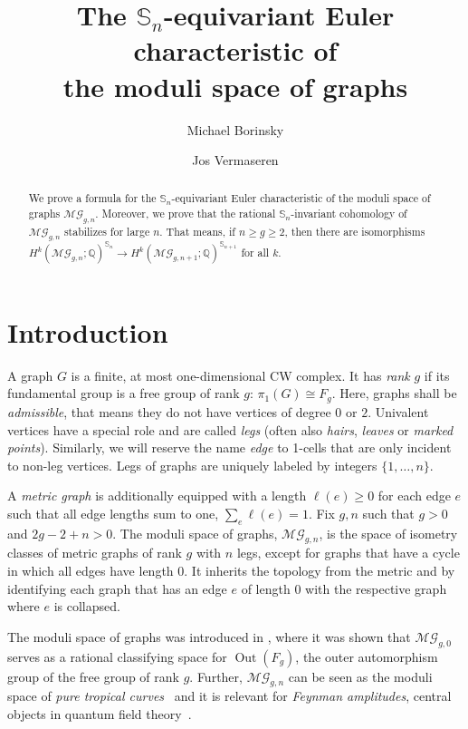 \documentclass[oneside]{amsart}
\title[The ${\mathbb S}_n$-equivariant Euler characteristic of the moduli space of graphs]{The ${\mathbb S}_n$-equivariant Euler characteristic of\\ the moduli space of graphs}
\author{Michael Borinsky \and Jos Vermaseren}
\theoremstyle{remark}
\newcommand{\Out}{{\operatorname{Out}}}
\newcommand{\MG}{\mathcal{MG}}
\begin{document}
\begin{abstract}
We prove a formula for the ${\mathbb S}_n$-equivariant Euler characteristic of the moduli space of graphs $\mathcal{MG}_{g,n}$. Moreover, we prove that the rational ${\mathbb S}_n$-invariant cohomology of $\mathcal{MG}_{g,n}$ stabilizes for large $n$. That means, if $n \geq g \geq 2$, then there are isomorphisms $H^k(\mathcal{MG}_{g,n};\mathbb{Q})^{{\mathbb S}_n} \rightarrow H^k(\mathcal{MG}_{g,n+1};\mathbb{Q})^{{\mathbb S}_{n+1}}$ for all $k$.
\end{abstract}
\maketitle

%
\section{Introduction}
A graph $G$ is a finite, at most one-dimensional CW complex. It has \emph{rank} $g$ if its fundamental group is a free group of rank $g$: $\pi_1(G) \cong F_g$. %
Here, graphs shall be \emph{admissible}, that means they do not have vertices of degree $0$ or $2$.
Univalent vertices have a special role and are called \emph{legs} (often also \emph{hairs}, \emph{leaves} or \emph{marked points}).
Similarly, we will reserve the name \emph{edge} to 1-cells that are only incident to non-leg vertices.
%
Legs of graphs are uniquely labeled by integers $\{1,\ldots,n\}$.

A \emph{metric graph} is additionally equipped with a length $\ell(e) \geq 0$ for each edge $e$ such that all edge lengths sum to one, $\sum_{e} \ell(e)=1$.
Fix $g,n$ such that $g >0$ and $2g-2+n > 0$. 
The moduli space of graphs, $\MG_{g,n}$,
is the space of isometry classes of metric graphs of rank $g$ with $n$ legs, except for graphs  that have a cycle in which all edges have length $0$.
It inherits the topology from the metric and by identifying each graph that has an edge $e$ of length $0$ with the respective graph where $e$ is collapsed.

The moduli space of graphs was introduced in \cite{CV},
where it was shown that $\MG_{g,0}$ serves as a rational classifying space for
$\Out(F_g)$, the outer automorphism group of the free group of rank $g$.
%
Further,
$\MG_{g,n}$ can be seen as the moduli space of \emph{pure tropical curves}~\cite{Abramovich} and it is relevant for  \emph{Feynman amplitudes}, central objects in quantum field theory~\cite{Berghoff:2017dyq}. 
\end{document}

